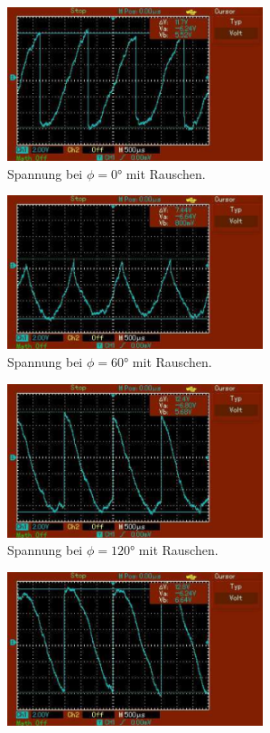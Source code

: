 \begin{figure}[H]
  \begin{subfigure}{0.42\textwidth}
      \centering
      \includegraphics[height=4.5cm]{content/abbildungen/mit/0.pdf}
      \caption{Spannung bei $\phi = 0°$ mit Rauschen.}
  \end{subfigure}
\hfill 
  \begin{subfigure}{0.42\textwidth}
      \centering
      \includegraphics[height=4.5cm]{content/abbildungen/mit/60.pdf}
      \caption{Spannung bei $\phi = 60°$ mit Rauschen.}
  \end{subfigure}
\hfill 
  \begin{subfigure}{0.42\textwidth}
      \centering
      \includegraphics[height=4.5cm]{content/abbildungen/mit/120.pdf}
      \caption{Spannung bei $\phi = 120°$ mit Rauschen.}
  \end{subfigure}
\hfill 
  \begin{subfigure}{0.42\textwidth}
      \centering
      \includegraphics[height=4.5cm]{content/abbildungen/mit/180.pdf}

\end{subfigure}
\end{figure}
